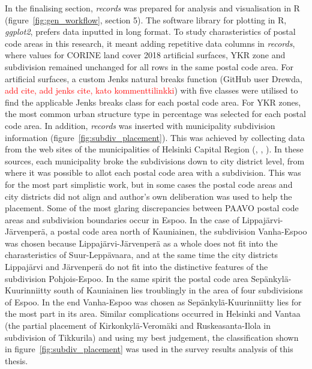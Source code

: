 In the finalising section, \textit{records} was prepared for analysis and visualisation in R (figure~\ref{fig:gen_workflow}, section 5). The software library for plotting in R, \textit{ggplot2}, prefers data inputted in long format. To study charasteristics of postal code areas in this research, it meant adding repetitive data columns in \textit{records}, where values for CORINE land cover 2018 artificial surfaces, YKR zone and subdivision remained unchanged for all rows in the same postal code area. For artificial surfaces, a custom Jenks natural breaks function (GitHub user Drewda, \textcolor{red}{add cite, add jenks cite, kato kommenttilinkki}) with five classes were utilised to find the applicable Jenks breaks class for each postal code area. For YKR zones, the most common urban structure type in percentage was selected for each postal code area. In addition, \textit{records} was inserted with municipality subdivision information (figure~\ref{fig:subdiv_placement}). This was achieved by collecting data from the web sites of the municipalities of Helsinki Capital Region (\cite{Espoonkaupunki2020}, \cite{Helsinginkaupunkiymparistontoimiala2019}, \cite{Vantaankaupunki2019}). In these sources, each municipality broke the subdivisions down to city district level, from where it was possible to allot each postal code area with a subdivision. This was for the most part simplistic work, but in some cases the postal code areas and city districts did not align and author's own deliberation was used to help the placement. Some of the most glaring discrepancies between PAAVO postal code areas and subdivision boundaries occur in Espoo. In the case of Lippajärvi-Järvenperä, a postal code area north of Kauniainen, the subdivision Vanha-Espoo was chosen because Lippajärvi-Järvenperä as a whole does not fit into the charasteristics of Suur-Leppävaara, and at the same time the city districts Lippajärvi and Järvenperä do not fit into the distinctive features of the subdivision Pohjois-Espoo. In the same spirit the postal code area Sepänkylä-Kuurinniitty south of Kauniainen lies troublingly in the area of four subdivisions of Espoo. In the end Vanha-Espoo was chosen as Sepänkylä-Kuurinniitty lies for the most part in its area. Similar complications occurred in Helsinki and Vantaa (the partial placement of Kirkonkylä-Veromäki and Ruskeasanta-Ilola in subdivision of Tikkurila) and using my best judgement, the classification shown in figure~\ref{fig:subdiv_placement} was used in the survey results analysis of this thesis.

